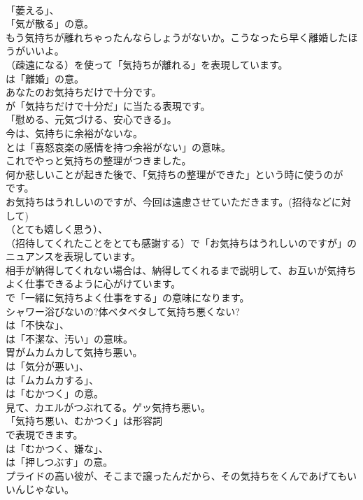 \documentclass[8pt]{extreport}
\begin{document}
\begin{CJK}{UTF8}{min}
\\	「萎える」、
\\	「気が散る」の意。	
\\	もう気持ちが離れちゃったんならしょうがないか。こうなったら早く離婚したほうがいいよ。 
\\	（疎遠になる）を使って「気持ちが離れる」を表現しています。
\\	は「離婚」の意。	
\\	あなたのお気持ちだけで十分です。 
\\	が「気持ちだけで十分だ」に当たる表現です。
\\	「慰める、元気づける、安心できる」。	
\\	今は、気持ちに余裕がないな。 
\\	とは「喜怒哀楽の感情を持つ余裕がない」の意味。	
\\	これでやっと気持ちの整理がつきました。 
\\	何か悲しいことが起きた後で、「気持ちの整理ができた」という時に使うのが
\\	です。	
\\	お気持ちはうれしいのですが、今回は遠慮させていただきます。(招待などに対して) 
\\	（とても嬉しく思う）、
\\	（招待してくれたことをとても感謝する）で「お気持ちはうれしいのですが」のニュアンスを表現しています。	
\\	相手が納得してくれない場合は、納得してくれるまで説明して、お互いが気持ちよく仕事できるように心がけています。 
\\	で「一緒に気持ちよく仕事をする」の意味になります。	
\\	シャワー浴びないの?体ベタベタして気持ち悪くない? 
\\	は「不快な」、
\\	は「不潔な、汚い」の意味。	
\\	胃がムカムカして気持ち悪い。 
\\	は「気分が悪い」、
\\	は「ムカムカする」、
\\	は「むかつく」の意。	
\\	見て、カエルがつぶれてる。ゲッ気持ち悪い。 
\\	「気持ち悪い、むかつく」は形容詞 
\\	で表現できます。
\\	は「むかつく、嫌な」、
\\	は「押しつぶす」の意。	
\\	プライドの高い彼が、そこまで譲ったんだから、その気持ちをくんであげてもいいんじゃない。 

\end{CJK}
\end{document}
